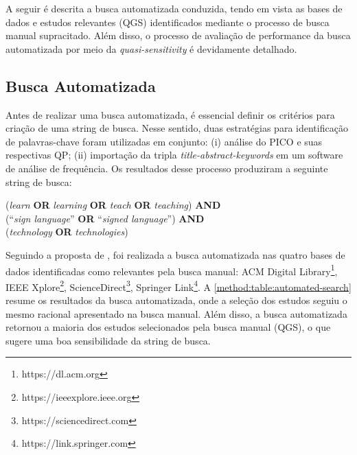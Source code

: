 A seguir é descrita a busca automatizada conduzida, tendo em vista as bases de dados e estudos relevantes (QGS) identificados mediante o processo de busca manual supracitado. Além disso, o processo de avaliação de performance da busca automatizada por meio da \textit{quasi-sensitivity} é devidamente detalhado.

\subsection{Busca Automatizada}
\label{ms:conducao-busca-automatizada}

Antes de realizar uma busca automatizada, é essencial definir os critérios para criação de uma string de busca. Nesse sentido, duas estratégias para identificação de palavras-chave foram utilizadas em conjunto: (i) análise do PICO e suas respectivas QP; (ii) importação da tripla \textit{title-abstract-keywords} em um software de análise de frequência. Os resultados desse processo produziram a seguinte string de busca:

\begin{center}
    (\textit{learn} \textbf{OR} \textit{learning} \textbf{OR} \textit{teach} \textbf{OR} \textit{teaching}) \textbf{AND}\\
    (``\textit{sign language}'' \textbf{OR} ``\textit{signed language}'') \textbf{AND}\\
    (\textit{technology} \textbf{OR} \textit{technologies})\\
\end{center}

Seguindo a proposta de , foi realizada a busca automatizada nas quatro bases de dados identificadas como relevantes pela busca manual: ACM Digital Library\footnote{https://dl.acm.org}, IEEE Xplore\footnote{https://ieeexplore.ieee.org}, ScienceDirect\footnote{https://sciencedirect.com}, Springer Link\footnote{https://link.springer.com}. %
A \autoref{method:table:automated-search} resume os resultados da busca automatizada, onde a seleção dos estudos seguiu o mesmo racional apresentado na busca manual. Além disso, a busca automatizada retornou a maioria dos estudos selecionados pela busca manual (QGS), o que sugere uma boa sensibilidade da string de busca. %

